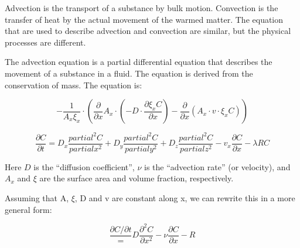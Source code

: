 \documentclass{tufte-handout}\usepackage[]{graphicx}\usepackage[]{xcolor}
\begin{document}
Advection is the transport of a substance by bulk motion. Convection is the transfer of heat by the actual movement of the warmed matter. The equation that are used to describe advection and convection are similar, but the physical processes are different.


The advection equation is a partial differential equation that describes the movement of a substance in a fluid. The equation is derived from the conservation of mass. The equation is:


\begin{equation}
- \frac{1}{A_x \xi_x} \cdot \left( \frac{\partial}{\partial x} A_x \cdot \left( -D \cdot \frac{\partial \xi_x C}{\partial x} \right) - \frac{\partial}{\partial x} \left( A_x \cdot v \cdot \xi_x C \right) \right)
\end{equation}

\begin{equation}
\frac{\partial C}{\partial t} = D_x \frac{partial^2 C}{partial x^2} +
D_y \frac{partial^2 C}{partial y^2} +
D_z \frac{partial^2 C}{partial z^2} -
v_x \frac{\partial C}{\partial x} -
\lambda RC
\end{equation}





Here $D$ is the ``diffusion coefficient'', $\nu$ is the ``advection rate'' (or velocity), and $A_x$ and $\xi$ are the surface area and volume fraction, respectively. 

Assuming that A, $\xi$, D and v are constant along x, we can rewrite this in a more general form: 

\begin{equation}
\frac{\partial C/\partial t} =
D \frac{\partial^2 C}{\partial x^2} - \nu \frac{\partial C}{\partial x} - R
\end{equation}
\end{document}
